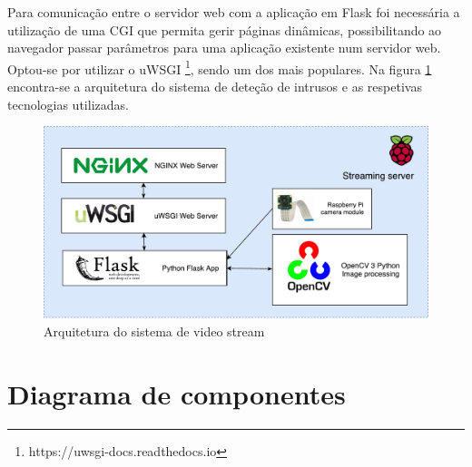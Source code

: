 Para comunicação entre o servidor web com a aplicação em Flask foi necessária a utilização de uma \ac{CGI} que permita gerir páginas dinâmicas, possibilitando ao navegador passar parâmetros para uma aplicação existente num servidor web. Optou-se por utilizar o uWSGI \footnote{https://uwsgi-docs.readthedocs.io}, sendo um dos mais populares. Na figura \ref{arquiteturavisao} encontra-se a arquitetura do sistema de deteção de intrusos e as respetivas tecnologias utilizadas.



\begin{figure}[h]
	\centering
	\includegraphics[scale = 0.5]{esquemas/videostream.pdf}
	\caption{Arquitetura do sistema de video stream}
	\label{arquiteturavisao}
\end{figure}





\newpage
\section{Diagrama de componentes}

